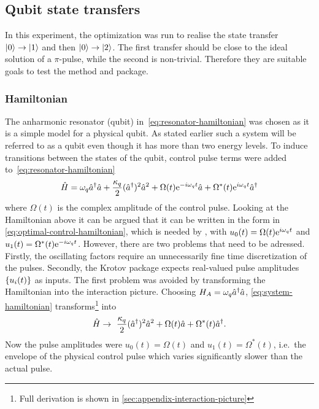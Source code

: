 \documentclass[main.tex]{subfiles}
\begin{document}
\subsection{Qubit state transfers}
In this experiment, the optimization was run to realise the state transfer \(\ket{0}\rightarrow\ket{1}\) and then \(\ket{0}\rightarrow\ket{2}\).
The first transfer should be close to the ideal solution of a \(\pi\)-pulse, while the second is non-trivial.
Therefore they are suitable goals to test the method and package.

\subsubsection{Hamiltonian}
The anharmonic resonator (qubit) in~\cref{eq:resonator-hamiltonian} was chosen as it is a simple model for a physical qubit.
As stated earlier such a system will be referred to as a qubit even though it has more than two energy levels.
To induce transitions between the states of the qubit, control pulse terms were added to~\cref{eq:resonator-hamiltonian}
\begin{equation}
    \hat{H} = \omega_{q} \hat{a}^\dagger\hat{a} + \frac{\kappa_q}{2} (\hat{a}^\dagger)^2\hat{a}^2 + \Omega(t)\mathrm{e}^{-i\omega_{q}t}\hat{a} + \Omega^*(t)\mathrm{e}^{i\omega_{q}t}\hat{a}^\dagger
    \label{eq:system-hamiltonian}
\end{equation}
where \( \Omega(t) \) is the complex amplitude of the control pulse.
Looking at the Hamiltonian above it can be argued that it can be written in the form in \cref{eq:optimal-control-hamiltonian}, which is needed by \krotov{}, with \( u_0(t) = \Omega(t)\mathrm{e}^{i\omega_{q}t} \) and \( u_1(t) = \Omega^*(t)\mathrm{e}^{-i\omega_{q}t} \).
However, there are two problems that need to be adressed.
Firstly, the oscillating factors require an unnecessarily fine time discretization of the pulses.
Secondly, the Krotov package expects real-valued pulse amplitudes \( \qty{u_i(t)} \) as inputs.
The first problem was avoided by transforming the Hamiltonian into the interaction picture.
Choosing \( H_A = \omega_{q} \hat{a}^\dagger\hat{a} \), \cref{eq:system-hamiltonian} transforms\footnote{Full derivation is shown in \cref{sec:appendix-interaction-picture}} into
\begin{equation}
    \hat{H} \rightarrow~ \frac{\kappa_q}{2}(\hat{a}^\dagger)^2\hat{a}^2 + \Omega(t)\hat{a} + \Omega^*(t)\hat{a}^\dagger.
    \label{eq:krotov-hamiltonian-rotating}
\end{equation}
Now the pulse amplitudes were \( u_0(t) = \Omega(t) \) and \( u_1(t) = \Omega^*(t) \), i.e.\ the envelope of the physical control pulse which varies significantly slower than the actual pulse.
\end{document}
